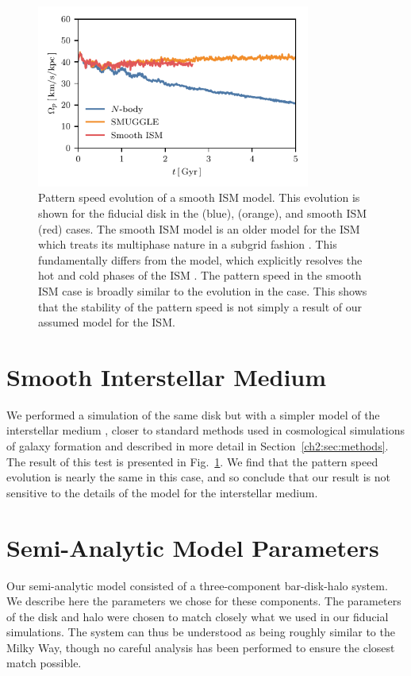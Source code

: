 \begin{appendices}
\begin{figure}
    \centering
    \includegraphics[width=9cm]{ch2/fig/ps_GFM.pdf}
    \caption{Pattern speed evolution of a smooth ISM model. This evolution is
    shown for the fiducial disk in the \Nbody{} (blue), \SMUGGLE{} (orange), and
    smooth ISM (red) cases. The smooth ISM model is an older model for the ISM
    which treats its multiphase nature in a subgrid fashion
    \citep{2003MNRAS.339..289S}. This fundamentally differs from the \SMUGGLE{}
    model, which explicitly resolves the hot and cold phases of the ISM
    \citep{2019MNRAS.489.4233M}. The pattern speed in the smooth ISM case is
    broadly similar to the evolution in the \SMUGGLE{} case. This shows that the
    stability of the pattern speed is not simply a result of our assumed model
    for the ISM.}
\label{fig:GFM}
\end{figure}

\section{Smooth Interstellar Medium}
We performed a simulation of the same disk but with a simpler model of the
interstellar medium \citep{2003MNRAS.339..289S}, closer to standard methods used
in cosmological simulations of galaxy formation and described in more detail in
Section~\ref{ch2:sec:methods}. The result of this test is presented in
Fig.~\ref{fig:GFM}. We find that the pattern speed evolution is nearly the same
in this case, and so conclude that our result is not sensitive to the details of
the model for the interstellar medium.

\section{Semi-Analytic Model Parameters}
\label{ch2:app:sam}
Our semi-analytic model consisted of a three-component bar-disk-halo system. We
describe here the parameters we chose for these components. The parameters of
the disk and halo were chosen to match closely what we used in our fiducial
simulations. The system can thus be understood as being roughly similar to the
Milky Way, though no careful analysis has been performed to ensure the closest
match possible.


\end{appendices}
